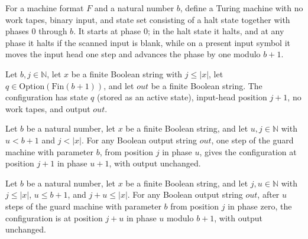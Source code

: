 \begin{definition}
\label{Turing.MachineFormat.guardBlockTM}
\leanok
{}
For a machine format $F$ and a natural number $b$, define a Turing machine with no work
tapes, binary input, and state set consisting of a halt state together with phases $0$
through $b$. It starts at phase $0$; in the halt state it halts, and at any phase it
halts if the scanned input is blank, while on a present input symbol it moves the input
head one step and advances the phase by one modulo $b+1$.
\end{definition}

\begin{definition}
\label{Turing.MachineFormat.guardCfg}
\leanok
{}
Let $b,j\in\mathbb{N}$, let $x$ be a finite Boolean string with $j\leq |x|$, let
$q\in\mathrm{Option}(\mathrm{Fin}(b+1))$, and let $out$ be a finite Boolean string. The
configuration has state $q$ (stored as an active state), input-head position $j+1$, no
work tapes, and output $out$.
\end{definition}

\begin{lemma}
\label{Turing.MachineFormat.guardBlock_step}
\leanok
{}
Let $b$ be a natural number, let $x$ be a finite Boolean string, and let $u,j\in\mathbb
N$ with $u<b+1$ and $j<|x|$. For any Boolean output string $out$, one step of the guard
machine with parameter $b$, from position $j$ in phase $u$, gives the configuration at
position $j+1$ in phase $u+1$, with output unchanged.
\end{lemma}

\begin{lemma}
\label{Turing.MachineFormat.guardBlock_run}
\leanok
{}
Let $b$ be a natural number, let $x$ be a finite Boolean string, and let $j,u\in\mathbb
N$ with $j\le |x|$, $u\le b+1$, and $j+u\le |x|$. For any Boolean output string $out$,
after $u$ steps of the guard machine with parameter $b$ from position $j$ in phase zero,
the configuration is at position $j+u$ in phase $u$ modulo $b+1$, with output unchanged.
\end{lemma}

